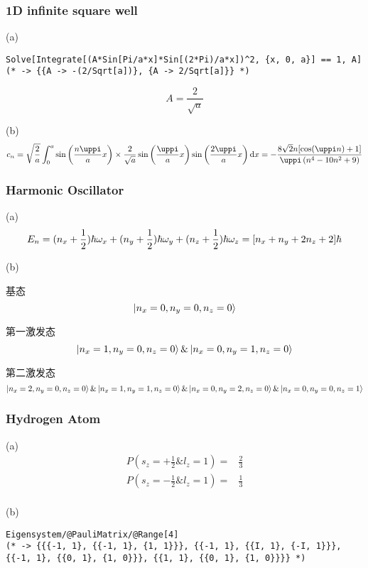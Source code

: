 \subsubsection{1D infinite square well}

(a)
\begin{verbatim}
Solve[Integrate[(A*Sin[Pi/a*x]*Sin[(2*Pi)/a*x])^2, {x, 0, a}] == 1, A]
(* -> {{A -> -(2/Sqrt[a])}, {A -> 2/Sqrt[a]}} *)
\end{verbatim}
\[
    A = \frac{2}{\sqrt{a}}
\]

(b)
\[
    c_n = \sqrt{\frac{2}{a}} \int_0^a \sin \qty(\frac{n \uppi}{a} x) \times \frac{2}{\sqrt{a}} \sin \qty(\frac{\uppi}{a} x) \sin \qty(\frac{2 \uppi}{a} x) \dd{x} = -\frac{8 \sqrt{2} n [\cos (\uppi  n)+1]}{\uppi  \left(n^4-10 n^2+9\right)}
\]

\subsubsection{Harmonic Oscillator}

(a)
\[
    E_n = (n_x + \frac{1}{2}) \hbar \omega_x + (n_y + \frac{1}{2}) \hbar \omega_y + (n_z + \frac{1}{2}) \hbar \omega_z = \qty[n_x + n_y + 2 n_z + 2] \hbar
\]

(b)

基态 \[
    \ket{n_x = 0, n_y = 0, n_z = 0}
\]

第一激发态 \[
    \ket{n_x = 1, n_y = 0, n_z = 0} \& \ket{n_x = 0, n_y = 1, n_z = 0}
\]

第二激发态 \[
    \ket{n_x = 2, n_y = 0, n_z = 0} \& \ket{n_x = 1, n_y = 1, n_z = 0} \& \ket{n_x = 0, n_y = 2, n_z = 0} \& \ket{n_x = 0, n_y = 0, n_z = 1}
\]

\subsubsection{Hydrogen Atom}

(a)
\begin{align*}
    P(s_z = + \frac{1}{2} \& l_z = 1) = & \frac{2}{3} \\
    P(s_z = - \frac{1}{2} \& l_z = 1) = & \frac{1}{3} \\
\end{align*}

(b)

\begin{verbatim}
Eigensystem/@PauliMatrix/@Range[4]
(* -> {{{-1, 1}, {{-1, 1}, {1, 1}}}, {{-1, 1}, {{I, 1}, {-I, 1}}}, {{-1, 1}, {{0, 1}, {1, 0}}}, {{1, 1}, {{0, 1}, {1, 0}}}} *)
\end{verbatim}

